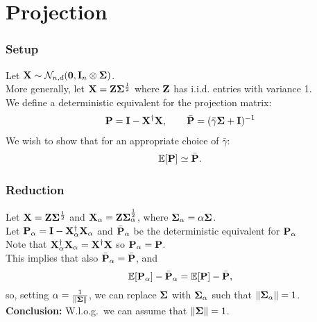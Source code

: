 \documentclass[10pt]{beamer}
\begin{document}
\section{Projection}

\begin{frame}
  \frametitle{Setup}
  Let $\X\sim \Nc_{n,d}(\zero,\I_n\otimes\Sigmab)$.\\
  More generally, let $\X = \Z\Sigmab^{\frac12}$ where
  $\Z$ has i.i.d. entries with variance 1.\\[5mm]

We define a deterministic equivalent for the projection matrix:
  \begin{align*}
    \P =\I-\X^\dagger\X,\qquad \bar\P =
    (\bar\gamma\Sigmab + \I)^{-1}
  \end{align*}
  We wish to show that for an appropriate choice of $\bar\gamma$:
  \begin{align*}
    \E[\P] \simeq \bar\P.
    \end{align*}
  \end{frame}

  \begin{frame}
    \frametitle{Reduction}
    Let $\X = \Z\Sigmab^{\frac12}$ and
    $\X_\alpha=\Z\Sigmab_\alpha^{\frac12}$, where
    $\Sigmab_\alpha=\alpha\Sigmab$.\\
Let $\P_\alpha=\I-\X_\alpha^\dagger\X_\alpha$ and
    $\bar\P_\alpha$ be the deterministic equivalent for $\P_\alpha$\\[3mm]

    Note that $\X_\alpha^\dagger\X_\alpha=\X^\dagger\X$ so
    $\P_\alpha=\P$. \\
    This implies that also $\bar\P_\alpha=\bar\P$, and
    \[\E[\P_\alpha]-\bar\P_\alpha = \E[\P]-\bar\P,\]
    so, setting $\alpha=\frac1{\|\Sigmab\|}$, we can replace $\Sigmab$
    with $\Sigmab_\alpha$ such that
    $\|\Sigmab_\alpha\|=1$.\\[5mm]
    \textbf{Conclusion:} W.l.o.g.~we can assume that $\|\Sigmab\|=1$.
  \end{frame}
\end{document}
